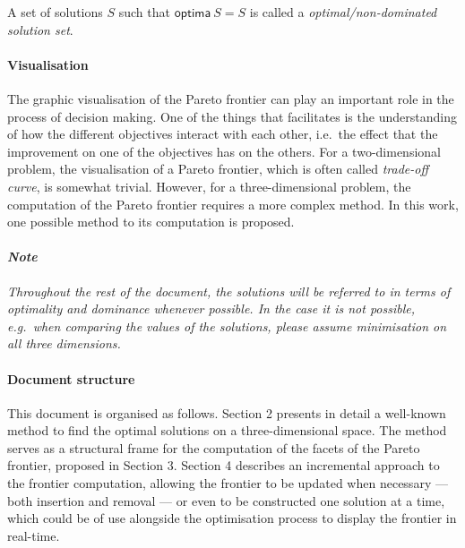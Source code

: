 \begin{defn} 
A set of solutions $S$ such that $\mathsf{optima\ } S = S$ is called a \textit{optimal/non-dominated solution set}.
\end{defn}

\paragraph{Visualisation} The graphic visualisation of the Pareto frontier can play an important role in the process of decision making. One of the things that facilitates is the understanding of how the different objectives interact with each other, i.e.\ the effect that the improvement on one of the objectives has on the others. For a two-dimensional problem, the visualisation of a Pareto frontier, which is often called \textit{trade-off curve}, is somewhat trivial. However, for a three-dimensional problem, the computation of the Pareto frontier requires a more complex method. In this work, one possible method to its computation is proposed.
\ \ 



\paragraph{\textit{Note}} \textit{Throughout the rest of the document, the solutions will be referred to in terms of optimality and dominance whenever possible. In the case it is not possible, e.g.\ when comparing the values of the solutions, please assume minimisation on all three dimensions.}

\paragraph{Document structure} This document is organised as follows. Section 2 presents in detail a well-known method to find the optimal solutions on a three-dimensional space. The method serves as a structural frame for the computation of the facets of the Pareto frontier, proposed in Section 3. Section 4 describes an incremental approach to the frontier computation, allowing the frontier to be updated when necessary --- both insertion and removal --- or even to be constructed one solution at a time, which could be of use alongside the optimisation process to display the frontier in real-time.